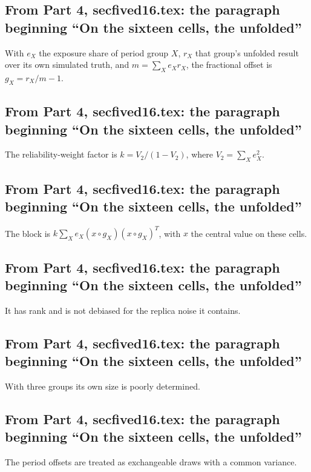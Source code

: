 \subsection{From Part 4, secfived16.tex: the paragraph beginning ``On the sixteen cells, the unfolded''}
With $e_X$ the exposure share of period group $X$, $r_X$ that group's unfolded result over its own simulated truth, and $m=\sum_X e_X r_X$, the fractional offset is $g_X=r_X/m-1$.

\subsection{From Part 4, secfived16.tex: the paragraph beginning ``On the sixteen cells, the unfolded''}
The reliability-weight factor is $k=V_2/(1-V_2)$, where $V_2=\sum_X e_X^2$.

\subsection{From Part 4, secfived16.tex: the paragraph beginning ``On the sixteen cells, the unfolded''}
The block is $k\sum_X e_X (x\circ g_X)(x\circ g_X)^{T}$, with $x$ the central value on these cells.

\subsection{From Part 4, secfived16.tex: the paragraph beginning ``On the sixteen cells, the unfolded''}
It has rank  and is not debiased for the replica noise it contains.

\subsection{From Part 4, secfived16.tex: the paragraph beginning ``On the sixteen cells, the unfolded''}
With three groups its own size is poorly determined.

\subsection{From Part 4, secfived16.tex: the paragraph beginning ``On the sixteen cells, the unfolded''}
The period offsets are treated as exchangeable draws with a common variance.

